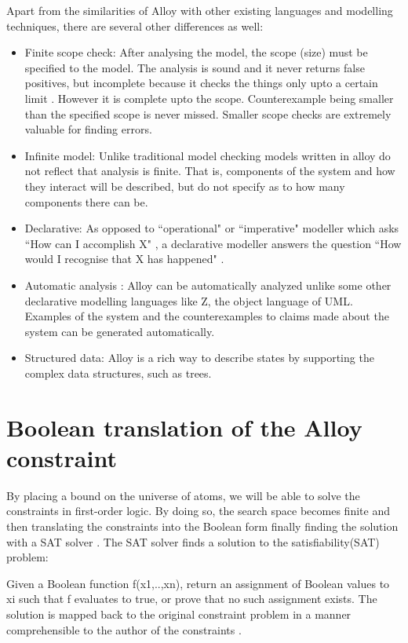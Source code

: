\documentclass[a4paper,10pt]{report}
\begin{document}
Apart from the similarities of Alloy with other existing languages and modelling techniques, there are several other differences as well:
\begin{itemize}
\item Finite scope check: After analysing the model, the scope (size) must be specified to the model. The analysis is sound and it never returns false positives, but incomplete because it checks the things only upto a certain limit \cite{DanielJackson}. However it is complete upto the scope. Counterexample being smaller than the specified scope is never missed. Smaller scope checks are extremely valuable for finding errors. 
\item Infinite model: Unlike traditional model checking models written in alloy do not reflect that analysis is finite\cite{D.Jackson}. That is, components of the system and how they interact will be described, but do not specify as to how many components there can be. 
\item Declarative: As opposed to ``operational" or ``imperative" modeller which asks ``How can I accomplish X" , a declarative modeller answers the question ``How would I recognise that X has happened" \cite{DanielJackson}.
\item Automatic analysis : Alloy can be automatically analyzed unlike some other declarative modelling languages like Z, the object language of UML\cite{J.M.Spivey1989}. 
Examples of the system and the counterexamples to claims made about the system can be generated automatically.
\item Structured data: Alloy is a rich way to describe states by supporting the complex data structures, such as trees.
\end{itemize}

\section{Boolean translation of the Alloy constraint}
\label{Bool Transl}

By placing a bound on the universe of atoms, we will be able to solve the constraints in first-order logic. By doing so, the search space becomes finite and then translating the constraints into the Boolean form finally finding the solution with a SAT solver \cite{Strichman}. The SAT solver finds a solution to the satisfiability(SAT) problem: 

Given a Boolean function f(x1,..,xn), return an assignment of Boolean values to xi such that f evaluates to true, or prove that no such assignment exists. The solution is mapped back to the original constraint problem in a manner comprehensible to the author of the constraints \cite{Yeung2005}.
\end{document}
